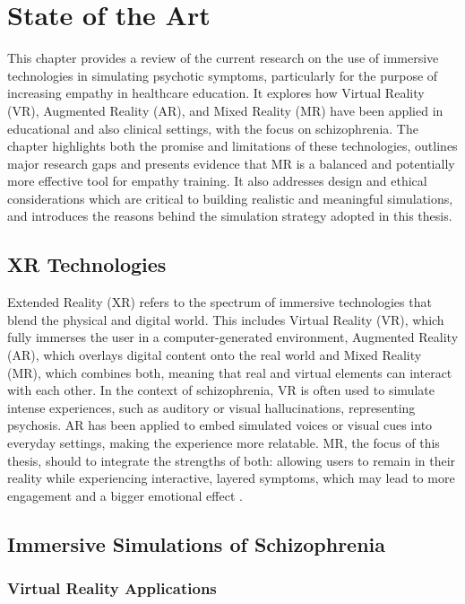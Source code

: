 \chapter{State of the Art}
\label{ch:background}

This chapter provides a review of the current research on the use of immersive technologies in simulating psychotic symptoms, particularly for the purpose of increasing empathy in healthcare education. It explores how Virtual Reality (VR), Augmented Reality (AR), and Mixed Reality (MR) have been applied in educational and also clinical settings, with the focus on schizophrenia. The chapter highlights both the promise and limitations of these technologies, outlines major research gaps and presents evidence that MR is a balanced and potentially more effective tool for empathy training. It also addresses design and ethical considerations which are critical to building realistic and meaningful simulations, and introduces the reasons behind the simulation strategy adopted in this thesis.

\section{XR Technologies}
Extended Reality (XR) refers to the spectrum of immersive technologies that blend the physical and digital world. This includes Virtual Reality (VR), which fully immerses the user in a computer-generated environment, Augmented Reality (AR), which overlays digital content onto the real world and Mixed Reality (MR), which combines both, meaning that real and virtual elements can interact with each other. In the context of schizophrenia, VR is often used to simulate intense experiences, such as auditory or visual hallucinations, representing psychosis. AR has been applied to embed simulated voices or visual cues into everyday settings, making the experience more relatable. MR, the focus of this thesis, should to integrate the strengths of both: allowing users to remain in their reality while experiencing interactive, layered symptoms, which may lead to more engagement and a bigger emotional effect \cite{Krogmeier2024, Silva2017, Zare-Bidaki2022}.

\section{Immersive Simulations of Schizophrenia}
\subsection{Virtual Reality Applications}

